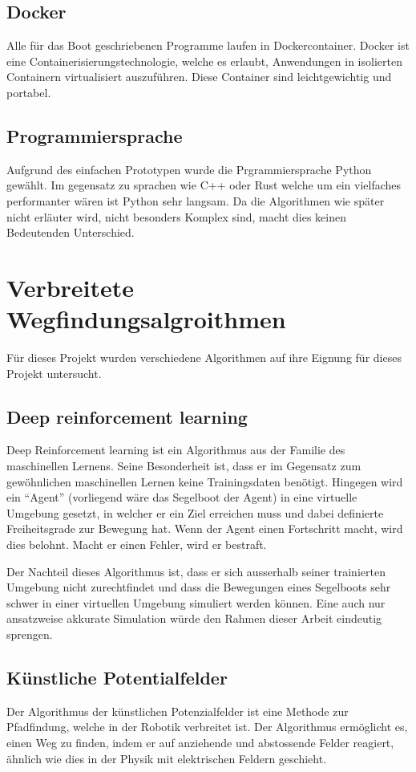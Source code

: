 \subsection*{Docker}
Alle für das Boot geschriebenen Programme laufen in Dockercontainer. Docker ist eine Containerisierungstechnologie, welche es erlaubt, Anwendungen in isolierten Containern virtualisiert auszuführen. Diese Container sind leichtgewichtig und portabel.

\subsection*{Programmiersprache}
Aufgrund des einfachen Prototypen wurde die Prgrammiersprache Python gewählt. Im gegensatz zu sprachen wie C++ oder Rust welche um ein vielfaches performanter wären ist Python sehr langsam. Da die Algorithmen wie später nicht erläuter wird, nicht besonders Komplex sind, macht dies keinen Bedeutenden Unterschied. 


\section{Verbreitete Wegfindungsalgroithmen}
Für dieses Projekt wurden verschiedene Algorithmen auf ihre Eignung für dieses Projekt untersucht.

\subsection{Deep reinforcement learning}
Deep Reinforcement learning ist ein Algorithmus aus der Familie des maschinellen Lernens. Seine Besonderheit ist, dass er im Gegensatz zum gewöhnlichen maschinellen Lernen keine Trainingsdaten benötigt. Hingegen wird ein \enquote{Agent} (vorliegend wäre das Segelboot der Agent) in eine virtuelle Umgebung gesetzt, in welcher er ein Ziel erreichen muss und dabei definierte Freiheitsgrade zur Bewegung hat. Wenn der Agent einen Fortschritt macht, wird dies belohnt. Macht er einen Fehler, wird er bestraft.

Der Nachteil dieses Algorithmus ist, dass er sich ausserhalb seiner trainierten Umgebung nicht zurechtfindet und dass die Bewegungen eines Segelboots sehr schwer in einer virtuellen Umgebung simuliert werden können. Eine auch nur ansatzweise akkurate Simulation würde den Rahmen dieser Arbeit eindeutig sprengen.

\subsection{Künstliche Potentialfelder} 
Der Algorithmus der künstlichen Potenzialfelder ist eine Methode zur Pfadfindung, welche in der Robotik verbreitet ist. Der Algorithmus ermöglicht es, einen Weg zu finden, indem er auf anziehende und abstossende Felder reagiert, ähnlich wie dies in der Physik mit elektrischen Feldern geschieht.

